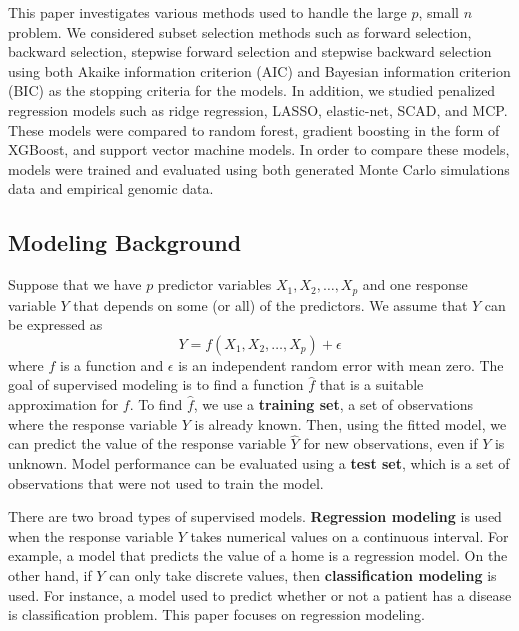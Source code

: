 \documentclass{article}
\begin{document}

This paper investigates various methods used to handle the large $p$, small $n$ problem. We considered subset selection methods such as forward selection, backward selection, stepwise forward selection and stepwise backward selection using both Akaike information criterion (AIC) and Bayesian information criterion (BIC) as the stopping criteria for the models. In addition, we studied penalized regression models such as ridge regression, LASSO, elastic-net, SCAD, and MCP. These models were compared to random forest, gradient boosting in the form of XGBoost, and support vector machine models. In order to compare these models, models were trained and evaluated using both generated Monte Carlo simulations data and empirical genomic data.

\subsection{Modeling Background}


Suppose that we have $p$ predictor variables $X_1, X_2, \dotsc, X_p$ and one response variable $Y$ that depends on some (or all) of the predictors. We assume that $Y$ can be expressed as
\begin{equation}\label{eqn:relationship}
	Y = f(X_1, X_2, \dotsc, X_p) + \epsilon
\end{equation}
where $f$ is a function and $\epsilon$ is an independent random error with mean zero. The goal of supervised modeling is to find a function $\hat{f}$ that is a suitable approximation for $f$. To find $\hat{f}$, we use a \textbf{training set}, a set of observations where the response variable $Y$ is already known. Then, using the fitted model, we can predict the value of the response variable $\hat{Y}$ for new observations, even if $Y$ is unknown. Model performance can be evaluated using a \textbf{test set}, which is a set of observations that were not used to train the model.

There are two broad types of supervised models. \textbf{Regression modeling} is used when the response variable $Y$ takes numerical values on a continuous interval. For example, a model that predicts the value of a home is a regression model. On the other hand, if $Y$ can only take discrete values, then \textbf{classification modeling} is used. For instance, a model used to predict whether or not a patient has a disease is classification problem. This paper focuses on regression modeling.
\end{document}
